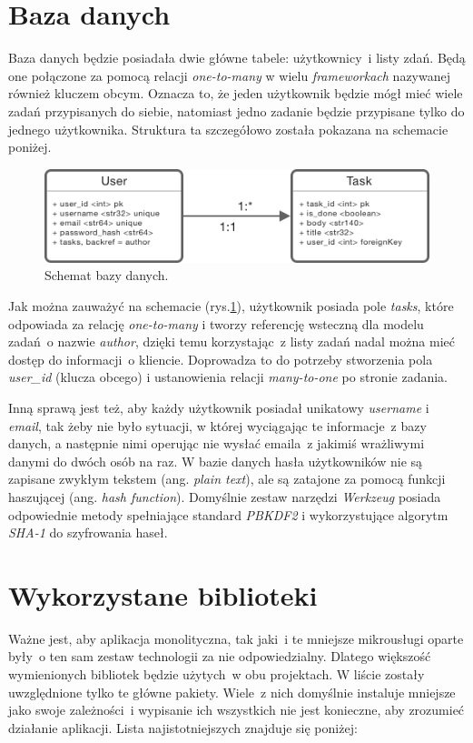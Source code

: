 \section{Baza danych}
\label{sec:bazadanych}
Baza danych będzie posiadała dwie główne tabele: użytkownicy~i listy zdań. Będą one połączone za pomocą relacji \textit{one-to-many} w wielu \textit{frameworkach} nazywanej również kluczem obcym. Oznacza to, że jeden użytkownik będzie mógł mieć wiele zadań przypisanych do siebie, natomiast jedno zadanie będzie przypisane tylko do jednego użytkownika. Struktura ta szczegółowo została pokazana na schemacie poniżej.
\begin{figure}[h!]
	\centering
		\includegraphics[width=12cm]{Rysunki/Rozdzial3/databaseSchema.png}
		\caption{Schemat bazy danych.}	
		\label{fig:schematbazydanych}
	\end{figure}
	
Jak można zauważyć na schemacie (rys.\ref{fig:schematbazydanych}), użytkownik posiada pole \textit{tasks}, które odpowiada za relację \textit{one-to-many} i tworzy referencję wsteczną\cite{Wilton:2005} dla modelu zadań~o nazwie \textit{author}, dzięki temu korzystając~z listy zadań nadal można mieć dostęp do informacji~o kliencie. Doprowadza to do potrzeby stworzenia pola \textit{user\_id} (klucza obcego) i ustanowienia relacji \textit{many-to-one} po stronie zadania.

Inną sprawą jest też, aby każdy użytkownik posiadał unikatowy \textit{username} i \textit{email}, tak żeby nie było sytuacji, w której wyciągając te informacje~z bazy danych, a następnie nimi operując nie wysłać emaila~z jakimiś wrażliwymi danymi do dwóch osób na raz. W bazie danych hasła użytkowników nie są zapisane zwykłym tekstem (ang. \textit{plain text}), ale są zatajone za pomocą funkcji haszującej (ang. \textit{hash function}). Domyślnie zestaw narzędzi \textit{Werkzeug} posiada odpowiednie metody spełniające standard \textit{PBKDF2} i wykorzystujące algorytm \textit{SHA-1} do szyfrowania haseł\cite{Ziade:2018}.

 
\section{Wykorzystane biblioteki}
Ważne jest, aby aplikacja monolityczna, tak jaki~i te mniejsze mikrousługi oparte były~o ten sam zestaw technologii za nie odpowiedzialny. Dlatego większość wymienionych bibliotek będzie użytych~w obu projektach. W liście zostały uwzględnione tylko te główne pakiety. Wiele~z nich domyślnie instaluje mniejsze jako swoje zależności~i wypisanie ich wszystkich nie jest konieczne, aby zrozumieć działanie aplikacji. Lista najistotniejszych znajduje się poniżej:


